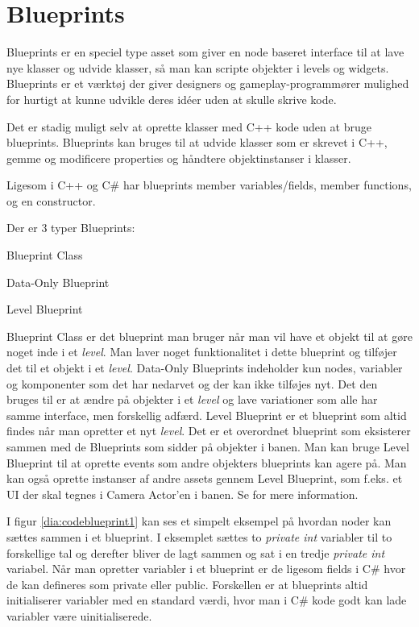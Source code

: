 \section{Blueprints}
Blueprints er en speciel type asset som giver en node baseret interface til at lave nye klasser og udvide klasser, så man kan scripte objekter i levels og widgets. Blueprints er et værktøj der giver designers og gameplay-programmører mulighed for hurtigt at kunne udvikle deres idéer uden at skulle skrive kode.

Det er stadig muligt selv at oprette klasser med C++ kode uden at bruge blueprints. Blueprints kan bruges til at udvide klasser som er skrevet i C++, gemme og modificere properties og håndtere objektinstanser i klasser.

Ligesom i C++ og C\# har blueprints member variables/fields, member functions, og en constructor.

\begin{list}{}{}
\item[Der er 3 typer Blueprints:]
\item[Blueprint Class]
\item[Data-Only Blueprint]
\item[Level Blueprint]
\end{list}

Blueprint Class er det blueprint man bruger når man vil have et objekt til at gøre noget inde i et \textit{level}. Man laver noget funktionalitet i dette blueprint og tilføjer det til et objekt i et \textit{level}. Data-Only Blueprints indeholder kun nodes, variabler og komponenter som det har nedarvet og der kan ikke tilføjes nyt. Det den bruges til er at ændre på objekter i et \textit{level} og lave variationer som alle har samme interface, men forskellig adfærd. Level Blueprint er et blueprint som altid findes når man opretter et nyt \textit{level}. Det er et overordnet blueprint som eksisterer sammen med de Blueprints som sidder på objekter i banen. Man kan bruge Level Blueprint til at oprette events som andre objekters blueprints kan agere på. Man kan også oprette instanser af andre assets gennem Level Blueprint, som f.eks. et UI der skal tegnes i Camera Actor'en i banen. Se \cite{blueprint} for mere information.

I figur \ref{dia:codeblueprint1} kan ses et simpelt eksempel på hvordan noder kan sættes sammen i et blueprint. I eksemplet sættes to \textit{private int} variabler til to forskellige tal og derefter bliver de lagt sammen og sat i en tredje \textit{private int} variabel. Når man opretter variabler i et blueprint er de ligesom fields i C\# hvor de kan defineres som private eller public. Forskellen er at blueprints altid initialiserer variabler med en standard værdi, hvor man i C\# kode godt kan lade variabler være uinitialiserede.


